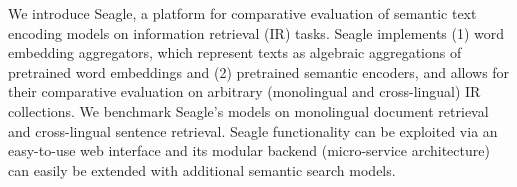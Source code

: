 We introduce Seagle, a platform for comparative evaluation of semantic text encoding models on information retrieval (IR) tasks. Seagle implements (1) word embedding aggregators, which represent texts as algebraic aggregations of pretrained word embeddings and (2) pretrained semantic encoders, and allows for their comparative evaluation on arbitrary (monolingual and cross-lingual) IR collections. We benchmark Seagle's models on monolingual document retrieval and cross-lingual sentence retrieval. Seagle functionality can be exploited via an easy-to-use web interface and its modular backend (micro-service architecture) can easily be extended with additional semantic search models.